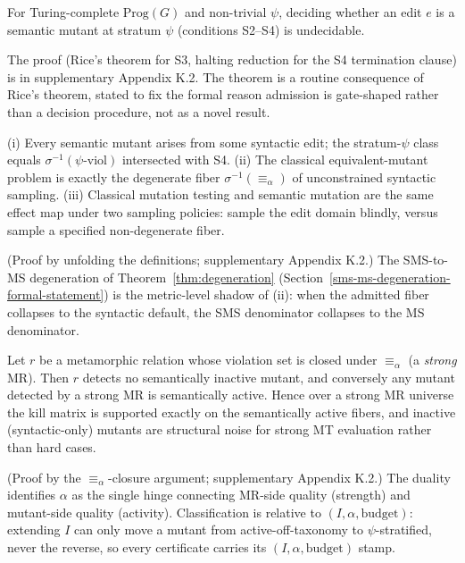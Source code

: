\documentclass[manuscript,screen,review]{acmart}
\begin{document}
\begin{theorem}\label{thm:undecidability}
For
Turing-complete $\mathrm{Prog}(G)$ and non-trivial $\psi$, deciding
whether an edit $e$ is a semantic mutant at stratum $\psi$
(conditions S2--S4) is undecidable.
\end{theorem}

The proof (Rice's theorem for S3, halting reduction for the S4 termination
clause) is in supplementary Appendix K.2. The theorem is a routine consequence
of Rice's theorem, stated to fix the formal reason admission is gate-shaped
rather than a decision procedure, not as a novel result.

\begin{proposition}\label{prop:fiber}
(i) Every semantic mutant arises from some syntactic edit; the
stratum-$\psi$ class equals $\sigma^{-1}(\psi\text{-viol})$ intersected
with S4. (ii) The classical equivalent-mutant problem is exactly the
degenerate fiber $\sigma^{-1}(\equiv_\alpha)$ of unconstrained syntactic
sampling. (iii) Classical mutation testing and semantic mutation are the
same effect map under two sampling policies: sample the edit domain
blindly, versus sample a specified non-degenerate fiber.
\end{proposition}

(Proof by unfolding the definitions; supplementary Appendix K.2.) The
SMS-to-MS degeneration of Theorem~\ref{thm:degeneration}
(Section~\ref{sms-ms-degeneration-formal-statement}) is the metric-level shadow
of (ii): when the admitted fiber collapses to the syntactic default, the SMS
denominator collapses to the MS denominator.

\begin{theorem}\label{thm:duality}
Let $r$ be a
metamorphic relation whose violation set is closed under $\equiv_\alpha$
(a \emph{strong} MR). Then $r$ detects no semantically inactive
mutant, and conversely any mutant detected by a strong MR is
semantically active. Hence over a strong MR universe the kill matrix
is supported exactly on the semantically active fibers, and inactive
(syntactic-only) mutants are structural noise for strong MT evaluation
rather than hard cases.
\end{theorem}

(Proof by the $\equiv_\alpha$-closure argument; supplementary Appendix K.2.)
The duality identifies $\alpha$ as the single hinge connecting MR-side quality
(strength) and mutant-side quality (activity). Classification is relative to
$(I, \alpha, \text{budget})$: extending $I$ can only move a mutant from
active-off-taxonomy to $\psi$-stratified, never the reverse, so every
certificate carries its $(I, \alpha, \text{budget})$ stamp.
\end{document}
